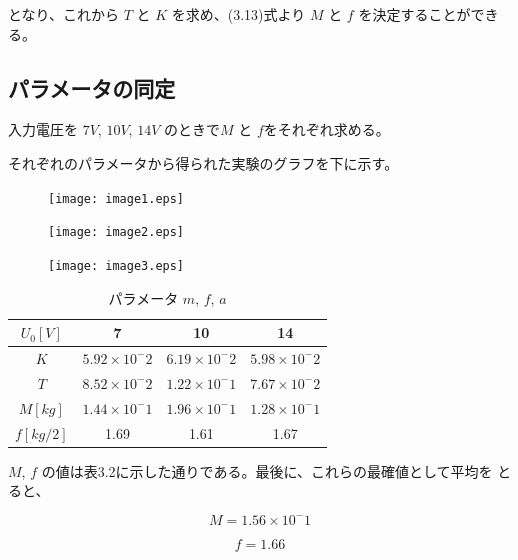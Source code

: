 \documentclass[10pt,a4paper,titlepage]{jreport} %
\begin{document}
となり、これから $T$ と $K$ を求め、(3.13)式より $M$ と $f$ を決定することができる。

\subsection{パラメータの同定}

入力電圧を $7V$, $10V$, $14V$ のときで$M$ と $f$をそれぞれ求める。

それぞれのパラメータから得られた実験のグラフを下に示す。

\begin{figure}[H] %
  \centering
  \texttt{[image: image1.eps]} %
\end{figure}

\begin{figure}[H] %
  \centering
  \texttt{[image: image2.eps]} %
\end{figure}

\begin{figure}[H] %
  \centering
  \texttt{[image: image3.eps]} %
\end{figure}

\begin{table}[htbp]
  \centering
  \caption{パラメータ $m$, $f$, $a$}
  \begin{tabular}{|c|c|c|c|}
  \hline
  $U_0[V]$ & 7 & 10 & 14 \\
  \hline
  $K$ & $5.92\times 10^-2$ & $6.19\times 10^-2$ & $5.98\times 10^-2$ \\ 
  \hline
  $T$ & $8.52\times 10^-2$ & $1.22\times 10^-1$ & $7.67\times 10^-2$ \\
  \hline
  $M[kg]$ & $1.44\times 10^-1$ & $1.96\times 10^-1$ & $1.28\times 10^-1$ \\
  \hline
  $f[kg/2]$ & 1.69 & 1.61 & 1.67 \\
  \hline
  \end{tabular}
\end{table}

  $M$, $f$ の値は表3.2に示した通りである。最後に、これらの最確値として平均を
  とると、

\begin{equation}
M = 1.56 \times 10^-1
\end{equation}

\begin{equation}
f = 1.66
\end{equation}
\end{document}
